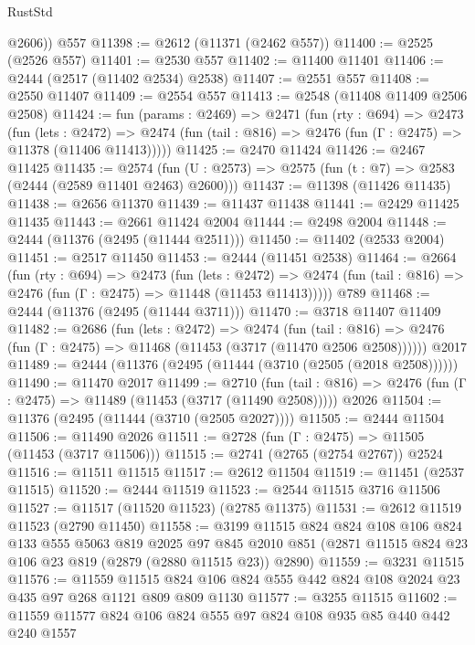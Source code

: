 \begin{lexlean}{RustStd}
\begin{coremodule}
        @2606))
    @557
@11398 := @2612 (@11371 (@2462 @557))
@11400 := @2525 (@2526 @557)
@11401 := @2530 @557
@11402 := @11400 @11401
@11406 := @2444 (@2517 (@11402 @2534) @2538)
@11407 := @2551 @557
@11408 := @2550 @11407
@11409 := @2554 @557
@11413 := @2548 (@11408 @11409 @2506 @2508)
@11424 := fun (params : @2469) =>
  @2471
    (fun (rty : @694) =>
    @2473
      (fun (lets : @2472) =>
      @2474 (fun (tail : @816) => @2476 (fun (Γ : @2475) => @11378 (@11406 @11413)))))
@11425 := @2470 @11424
@11426 := @2467 @11425
@11435 := @2574
    (fun (U : @2573) => @2575 (fun (t : @7) => @2583 (@2444 (@2589 @11401 @2463) @2600)))
@11437 := @11398 (@11426 @11435)
@11438 := @2656 @11370
@11439 := @11437 @11438
@11441 := @2429 @11425 @11435
@11443 := @2661 @11424 @2004
@11444 := @2498 @2004
@11448 := @2444 (@11376 (@2495 (@11444 @2511)))
@11450 := @11402 (@2533 @2004)
@11451 := @2517 @11450
@11453 := @2444 (@11451 @2538)
@11464 := @2664
    (fun (rty : @694) =>
    @2473
      (fun (lets : @2472) =>
      @2474 (fun (tail : @816) => @2476 (fun (Γ : @2475) => @11448 (@11453 @11413)))))
    @789
@11468 := @2444 (@11376 (@2495 (@11444 @3711)))
@11470 := @3718 @11407 @11409
@11482 := @2686
    (fun (lets : @2472) =>
    @2474
      (fun (tail : @816) =>
      @2476 (fun (Γ : @2475) => @11468 (@11453 (@3717 (@11470 @2506 @2508))))))
    @2017
@11489 := @2444 (@11376 (@2495 (@11444 (@3710 (@2505 (@2018 @2508))))))
@11490 := @11470 @2017
@11499 := @2710
    (fun (tail : @816) => @2476 (fun (Γ : @2475) => @11489 (@11453 (@3717 (@11490 @2508)))))
    @2026
@11504 := @11376 (@2495 (@11444 (@3710 (@2505 @2027))))
@11505 := @2444 @11504
@11506 := @11490 @2026
@11511 := @2728 (fun (Γ : @2475) => @11505 (@11453 (@3717 @11506)))
@11515 := @2741 (@2765 (@2754 @2767)) @2524
@11516 := @11511 @11515
@11517 := @2612 @11504
@11519 := @11451 (@2537 @11515)
@11520 := @2444 @11519
@11523 := @2544 @11515 @3716 @11506
@11527 := @11517 (@11520 @11523) (@2785 @11375)
@11531 := @2612 @11519 @11523 (@2790 @11450)
@11558 := @3199
    @11515
    @824
    @824
    @108
    @106
    @824
    @133
    @555
    @5063
    @819
    @2025
    @97
    @845
    @2010
    @851
    (@2871 @11515 @824 @23 @106 @23 @819 (@2879 (@2880 @11515 @23)) @2890)
@11559 := @3231 @11515
@11576 := @11559
    @11515
    @824
    @106
    @824
    @555
    @442
    @824
    @108
    @2024
    @23
    @435
    @97
    @268
    @1121
    @809
    @809
    @1130
@11577 := @3255 @11515
@11602 := @11559
    @11577
    @824
    @106
    @824
    @555
    @97
    @824
    @108
    @935
    @85
    @440
    @442
    @240
    @1557

\end{coremodule}
\end{lexlean}
